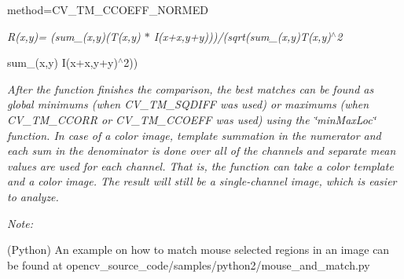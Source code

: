 {\itshape {\itshape }}

{\itshape {\itshape 
\begin{DoxyItemize}
\item method=C\+V\+\_\+\+T\+M\+\_\+\+C\+C\+O\+E\+F\+F\+\_\+\+N\+O\+R\+M\+ED 
\end{DoxyItemize}}}

{\itshape {\itshape }}

{\itshape {\itshape {\itshape R(x,y)= (sum\+\_\+(x\textquotesingle{},y\textquotesingle{})(T\textquotesingle{}(x\textquotesingle{},y\textquotesingle{}) $\ast$ I\textquotesingle{}(x+x\textquotesingle{},y+y\textquotesingle{})))/(sqrt(sum\+\_\+(x\textquotesingle{},y\textquotesingle{})T\textquotesingle{}(x\textquotesingle{},y\textquotesingle{})$^\wedge$2
\begin{DoxyItemize}
\item sum\+\_\+(x\textquotesingle{},y\textquotesingle{}) I\textquotesingle{}(x+x\textquotesingle{},y+y\textquotesingle{})$^\wedge$2))
\end{DoxyItemize}}}}

{\itshape {\itshape {\itshape }}}

{\itshape {\itshape {\itshape }}}

{\itshape {\itshape {\itshape After the function finishes the comparison, the best matches can be found as global minimums (when {\ttfamily C\+V\+\_\+\+T\+M\+\_\+\+S\+Q\+D\+I\+FF} was used) or maximums (when {\ttfamily C\+V\+\_\+\+T\+M\+\_\+\+C\+C\+O\+RR} or {\ttfamily C\+V\+\_\+\+T\+M\+\_\+\+C\+C\+O\+E\+FF} was used) using the \char`\"{}min\+Max\+Loc\char`\"{} function. In case of a color image, template summation in the numerator and each sum in the denominator is done over all of the channels and separate mean values are used for each channel. That is, the function can take a color template and a color image. The result will still be a single-\/channel image, which is easier to analyze.}}}

{\itshape {\itshape {\itshape }}}

{\itshape {\itshape {\itshape }}}

{\itshape {\itshape {\itshape Note\+:}}}

{\itshape {\itshape {\itshape  
\begin{DoxyItemize}
\item (Python) An example on how to match mouse selected regions in an image can be found at opencv\+\_\+source\+\_\+code/samples/python2/mouse\+\_\+and\+\_\+match.\+py 
\end{DoxyItemize}}}}

